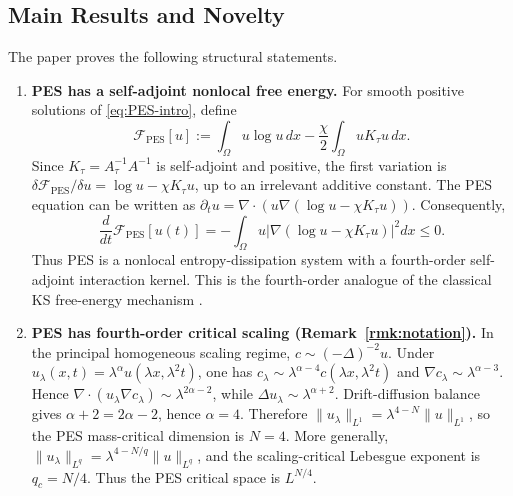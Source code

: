 \documentclass[pdflatex,sn-mathphys-num]{sn-jnl}%
\theoremstyle{thmstyleone}
\theoremstyle{thmstyletwo}
\theoremstyle{thmstylethree}
\begin{document}
\subsection{Main Results and Novelty}
\label{ssec:introduction_results}
The paper proves the following structural statements.

\begin{enumerate}[label=\textbf{Theorem \Alph*.}]

\item \textbf{PES has a self-adjoint nonlocal free energy.}
For smooth positive solutions of \eqref{eq:PES-intro}, define
\begin{equation}
\label{eq:PES-energy-intro}
        \mathcal F_{\mathrm{PES}}[u]
        :=
        \int_\Omega u\log u\,dx
        -
        \frac{\chi}{2}\int_\Omega uK_\tau u\,dx .
\end{equation}
Since \(K_\tau=A_\tau^{-1}A^{-1}\) is self-adjoint and positive, the first variation is \(\delta\mathcal F_{\mathrm{PES}}/\delta u=\log u-\chi K_\tau u\), up to an irrelevant additive constant.  The PES equation can be written as \(\partial_tu=\nabla\cdot(u\nabla(\log u-\chi K_\tau u))\).  Consequently,
\begin{equation}
\label{eq:PES-dissipation-intro}
        \frac{d}{dt}\mathcal F_{\mathrm{PES}}[u(t)]
        =
        -
        \int_\Omega u\left|\nabla(\log u-\chi K_\tau u)\right|^2dx
        \le0 .
\end{equation}
Thus PES is a nonlocal entropy-dissipation system with a fourth-order self-adjoint interaction kernel.  This is the fourth-order analogue of the classical KS free-energy mechanism \cite{nagai1995blow,blanchet2006two,blanchet2008infinite}.

\item \textbf{PES has fourth-order critical scaling (Remark~\ref{rmk:notation}).}
In the principal homogeneous scaling regime, \(c\sim(-\Delta)^{-2}u\).  Under \(u_\lambda(x,t)=\lambda^\alpha u(\lambda x,\lambda^2t)\), one has \(c_\lambda\sim\lambda^{\alpha-4}c(\lambda x,\lambda^2t)\) and \(\nabla c_\lambda\sim\lambda^{\alpha-3}\).  Hence \(\nabla\cdot(u_\lambda\nabla c_\lambda)\sim\lambda^{2\alpha-2}\), while \(\Delta u_\lambda\sim\lambda^{\alpha+2}\).  Drift-diffusion balance gives \(\alpha+2=2\alpha-2\), hence \(\alpha=4\).  Therefore \(\|u_\lambda\|_{L^1}=\lambda^{4-N}\|u\|_{L^1}\), so the PES mass-critical dimension is \(N=4\).  More generally, \(\|u_\lambda\|_{L^q}=\lambda^{4-N/q}\|u\|_{L^q}\), and the scaling-critical Lebesgue exponent is \(q_c=N/4\).  Thus the PES critical space is \(L^{N/4}\).


\end{enumerate}
\end{document}
